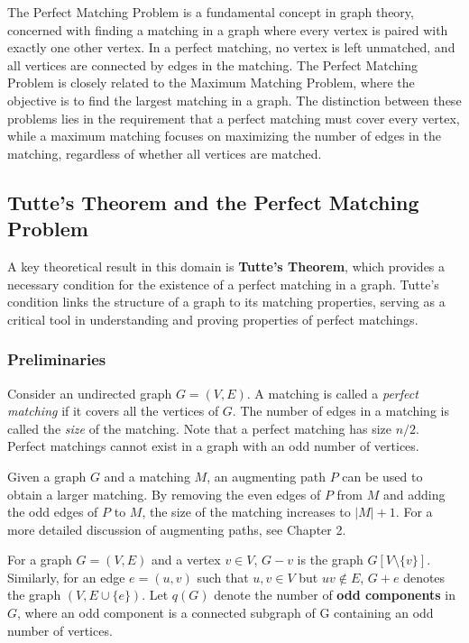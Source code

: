 
The Perfect Matching Problem is a fundamental concept in graph theory, concerned with finding a matching in a graph where every vertex is paired with exactly one other vertex. In a perfect matching, no vertex is left unmatched, and all vertices are connected by edges in the matching. The Perfect Matching Problem is closely related to the Maximum Matching Problem, where the objective is to find the largest matching in a graph. The distinction between these problems lies in the requirement that a perfect matching must cover every vertex, while a maximum matching focuses on maximizing the number of edges in the matching, regardless of whether all vertices are matched. 

\subsection{Tutte's Theorem and the Perfect Matching Problem}

A key theoretical result in this domain is \textbf{Tutte’s Theorem}, which provides a necessary condition for the existence of a perfect matching in a graph. Tutte’s condition links the structure of a graph to its matching properties, serving as a critical tool in understanding and proving properties of perfect matchings. \cite{tutte1947some}

\subsubsection*{Preliminaries}

Consider an undirected graph \( G = (V, E) \). A matching is called a \emph{perfect matching} if it covers all the vertices of \( G \). The number of edges in a matching is called the \emph{size} of the matching. Note that a perfect matching has size \( n/2 \). Perfect matchings cannot exist in a graph with an odd number of vertices.

Given a graph \( G \) and a matching \( M \), an augmenting path \( P \) can be used to obtain a larger matching. By removing the even edges of \( P \) from \( M \) and adding the odd edges of \( P \) to \( M \), the size of the matching increases to \( |M| + 1 \). For a more detailed discussion of augmenting paths, see Chapter 2.

For a graph \( G = (V, E) \) and a vertex \( v \in V \), \( G - v \) is the graph \( G[V \setminus \{v\}] \). Similarly, for an edge \( e = (u, v) \) such that \( u, v \in V \) but \( uv \notin E \), \( G + e \) denotes the graph \( (V, E \cup \{e\}) \). Let \( q(G) \) denote the number of \textbf{odd components} in \( G \), where an odd component is a connected subgraph of G containing an odd number of vertices. 

